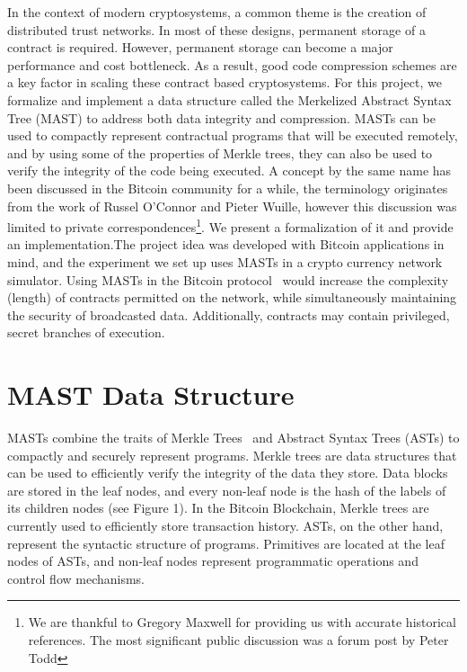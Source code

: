 \documentclass{vldb}
\begin{document}
In the context of modern cryptosystems, a common theme is the creation of
distributed trust networks. In most of these designs, permanent storage of a
contract is required. However, permanent storage can become a major performance
and cost bottleneck. As a result, good code compression schemes are a key
factor in scaling these contract based cryptosystems. For this project, we
formalize and implement a data structure called the Merkelized Abstract Syntax
Tree (MAST) to address both data integrity and compression. MASTs can be used
to compactly represent contractual programs that will be executed remotely, and
by using some of the properties of Merkle trees, they can also be used to
verify the integrity of the code being executed. A concept by the same name has
been discussed in the Bitcoin community for a while, the terminology originates
from the work of Russel O'Connor and Pieter Wuille, however this discussion was
limited to private correspondences\footnote{We are thankful to Gregory Maxwell
    for providing us with accurate historical references. The most significant
    public discussion was a forum post by Peter Todd\cite{bitcointalk}}.  We present a
    formalization of it and provide an implementation.The project idea was
    developed with Bitcoin applications in mind, and the experiment we set up
    uses MASTs in a crypto currency network simulator. Using MASTs in the
    Bitcoin protocol~\cite{bitcoin} would increase the complexity (length) of
    contracts permitted on the network, while simultaneously maintaining the
    security of broadcasted data.  Additionally, contracts may contain
    privileged, secret branches of execution.


\section{MAST Data Structure}

MASTs combine the traits of Merkle Trees~\cite{merkle} and Abstract Syntax
Trees (ASTs) to compactly and securely represent programs. Merkle trees are
data structures that can be used to efficiently verify the integrity of the
data they store.  Data blocks are stored in the leaf nodes, and every non-leaf
node is the hash of the labels of its children nodes (see Figure 1). In the
Bitcoin Blockchain, Merkle trees are currently used to efficiently store
transaction history. ASTs, on the other hand, represent the syntactic structure
of programs. Primitives are located at the leaf nodes of ASTs, and non-leaf
nodes represent programmatic operations and control flow mechanisms.
 
\end{document}
